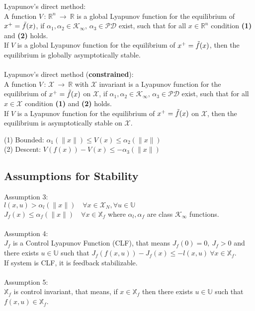 \documentclass[english]{latex4ei/latex4ei_sheet}
\begin{document}
\begin{sectionbox}

Lyapunov's direct method:\\
A function $V\,:\,\mathbb{R}^{n}\:\rightarrow\:\mathbb{R}$ is a global Lyapunov function for the equilibrium of $x^{+}=\Tilde{f}(x)$, if $\alpha_1,\alpha_2\in\mathcal{K}_{\infty},\,\alpha_3\in\mathcal{PD}$ exist, such that for all $x\in\mathbb{R}^n$ condition \textbf{(1)} and \textbf{(2)} holds.\\
If $V$ is a global Lyapunov function for the equilibrium of $x^{+}=\Tilde{f}(x)$, then the equilibrium is globally asymptotically stable.\\
\\
Lyapunov's direct method (\textbf{constrained}):\\
A function $V\,:\,\mathcal{X}\:\rightarrow\:\mathbb{R}$ with $\mathcal{X}$ invariant is a Lyapunov function for the equilibrium of $x^{+}=\Tilde{f}(x)$ on $\mathcal{X}$, if $\alpha_1,\alpha_2\in\mathcal{K}_{\infty},\,\alpha_3\in\mathcal{PD}$ exist, such that for all $x\in\mathcal{X}$ condition \textbf{(1)} and \textbf{(2)} holds.\\
If $V$ is a Lyapunov function for the equilibrium of $x^{+}=\Tilde{f}(x)$ on $\mathcal{X}$, then the equilibrium is asymptotically stable on $\mathcal{X}$.\\

\begin{emphbox}
    (1) Bounded: $\alpha_{1}(\|x\|) \leq V(x) \leq \alpha_{2}(\|x\|)$ \\ 
    (2) Descent: $V(f(x))-V(x) \leq-\alpha_{3}(\|x\|)$\\
\end{emphbox}

\subsection{Assumptions for Stability}
Assumption 3:\\
$l(x, u)>\alpha_{l}(\|x\|) \quad \forall x \in \mathcal{X}_{N}, \forall u \in \mathbb{U}$ \\ 
$J_{f}(x) \leq \alpha_{f}(\|x\|) \quad \forall x \in \mathbb{X}_{f}$ where $\alpha_{l}, \alpha_{f}$ are class $\mathcal{K}_{\infty}$ functions.\\
\\
Assumption 4:\\
$J_f$ is a Control Lyapunov Function (CLF), that means $J_f(0)=0,\ J_f>0$ and there exists $u\in\mathbb{U}$ such that $J_f(f(x,u))-J_f(x)\leq-l(x,u)\ \forall x\in\mathbb{X}_f$.\\
If system is CLF, it is feedback stabilizable.\\
\\
Assumption 5:\\
$\mathbb{X}_f$ is control invariant, that means, if $x\in\mathbb{X}_f$ then there exists $u\in\mathbb{U}$ such that $f(x,u)\in\mathbb{X}_f$.\\ 


\end{sectionbox}
\end{document}
